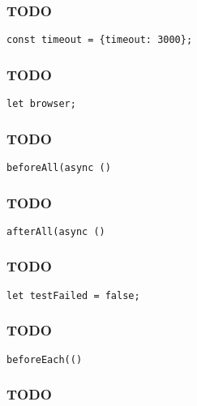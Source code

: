 \documentclass[a4paper]{article}
\begin{document}
\hypertarget{toc547}{}
\subsubsection{TODO}

\begin{lstlisting}
const timeout = {timeout: 3000};
\end{lstlisting}

\hypertarget{toc548}{}
\subsubsection{TODO}

\begin{lstlisting}
let browser;
\end{lstlisting}

\hypertarget{toc549}{}
\subsubsection{TODO}

\begin{lstlisting}
beforeAll(async ()
\end{lstlisting}

\hypertarget{toc550}{}
\subsubsection{TODO}

\begin{lstlisting}
afterAll(async ()
\end{lstlisting}

\hypertarget{toc551}{}
\subsubsection{TODO}

\begin{lstlisting}
let testFailed = false;
\end{lstlisting}

\hypertarget{toc552}{}
\subsubsection{TODO}

\begin{lstlisting}
beforeEach(()
\end{lstlisting}

\hypertarget{toc553}{}
\subsubsection{TODO}
\end{document}
